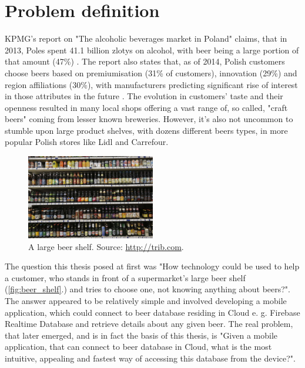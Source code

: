\documentclass[11pt]{article}
\begin{document}
\thispagestyle{empty}
\tableofcontents
\clearpage
\setcounter{page}{1}

\section{Problem definition} \label{problem_definition}
KPMG's report on "The alcoholic beverages market in Poland" claims, that in 2013, Poles spent 41.1 billion zlotys on alcohol, with beer being a large portion of that amount (47\%) \cite{kpmg_alco}. The report also states that, as of 2014, Polish customers choose beers based on premiumisation (31\% of customers), innovation (29\%) and region affiliations (30\%), with manufacturers predicting significant rise of interest in those attributes in the future \cite{kpmg_alco}. The evolution in customers' taste and their openness resulted in many local shops offering a vast range of, so called, "craft beers" coming from lesser known breweries. However, it's also not uncommon to stumble upon large product shelves, with dozens different beers types, in more popular Polish stores like Lidl and Carrefour.\\

\begin{figure}[h]
\includegraphics[width=0.5\textwidth]{beer_shelf}
\centering
\caption{A large beer shelf. Source: \protect \url{http://trib.com}.}
\label{fig:beer_shelf}
\end{figure}

The question this thesis posed at first was "How technology could be used to help a customer, who stands in front of a supermarket's large beer shelf (\autoref{fig:beer_shelf}.) and tries to choose one, not knowing anything about beers?". The answer appeared to be relatively simple and involved developing a mobile application, which could connect to beer database residing in Cloud e. g. Firebase Realtime Database and retrieve details about any given beer. The real problem, that later emerged, and is in fact the basis of this thesis, is "Given a mobile application, that can connect to beer database in Cloud, what is the most intuitive, appealing and fastest way of accessing this database from the device?".
\clearpage
\end{document}
